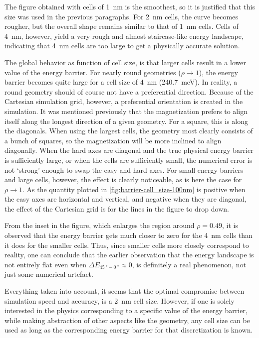 \documentclass[11pt,a4paper,english,twoside]{article}
\begin{document}
The figure obtained with cells of \SI{1}{\nano\metre} is the smoothest, so it is justified that this size was used in the previous paragraphs. For \SI{2}{\nano\metre} cells, the curve becomes rougher, but the overall shape remains similar to that of \SI{1}{\nano\metre} cells. Cells of \SI{4}{\nano\metre}, however, yield a very rough and almost staircase-like energy landscape, indicating that \SI{4}{\nano\metre} cells are too large to get a physically accurate solution. \par
The global behavior as function of cell size, is that larger cells result in a lower value of the energy barrier. For nearly round geometries ($\rho \rightarrow 1$), the energy barrier becomes quite large for a cell size of \SI{4}{\nano\metre} (\SI{240.7}{\milli\electronvolt}). In reality, a round geometry should of course not have a preferential direction. Because of the Cartesian simulation grid, however, a preferential orientation is created in the simulation. It was mentioned previously that the magnetization prefers to align itself along the longest direction of a given geometry. For a square, this is along the diagonals. When using the largest cells, the geometry most clearly consists of a bunch of squares, so the magnetization will be more inclined to align diagonally. When the hard axes are diagonal and the true physical energy barrier is sufficiently large, or when the cells are sufficiently small, the numerical error is not `strong' enough to swap the easy and hard axes. For small energy barriers and large cells, however, the effect is clearly noticeable, as is here the case for $\rho \rightarrow 1$. As the quantity plotted in \cref{fig:barrier-cell_size-100nm} is positive when the easy axes are horizontal and vertical, and negative when they are diagonal, the effect of the Cartesian grid is for the lines in the figure to drop down. \par
From the inset in the figure, which enlarges the region around $\rho=0.49$, it is observed that the energy barrier gets much closer to zero for the \SI{4}{\nano\metre} cells than it does for the smaller cells. Thus, since smaller cells more closely correspond to reality, one can conclude that the earlier observation that the energy landscape is not entirely flat even when $\Delta E_{\SI{45}{\degree}-\SI{0}{\degree}}\approx0$, is definitely a real phenomenon, not just some numerical artefact. \par
Everything taken into account, it seems that the optimal compromise between simulation speed and accuracy, is a \SI{2}{\nano\metre} cell size. However, if one is solely interested in the physics corresponding to a specific value of the energy barrier, while making abstraction of other aspects like the geometry, any cell size can be used as long as the corresponding energy barrier for that discretization is known.
\end{document}
